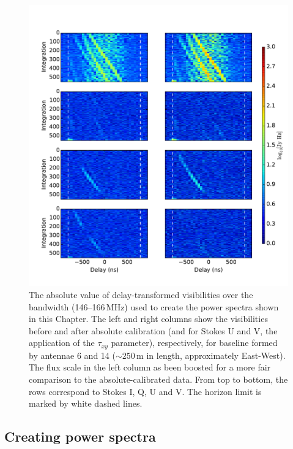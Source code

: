 \begin{figure}[h!]
\centering
\includegraphics[width=\columnwidth]{chapters/eor_window_PAPER/figures/delayfalls_wedgeres.pdf}
\caption[The absolute value of delay-transformed visibilities over the bandwidth (146--166\,MHz) used to create the power spectra shown in this Chapter.]{The absolute value of delay-transformed visibilities over the bandwidth (146--166\,MHz) used to create the power spectra shown in this Chapter. The left and right columns show the visibilities before and after absolute calibration (and for Stokes U and V, the application of the $\tau_{xy}$ parameter), respectively, for baseline formed by antennae 6 and 14 ($\sim 250$\,m in length, approximately East-West). The flux scale in the left column as been boosted for a more fair comparison to the absolute-calibrated data. From top to bottom, the rows correspond to Stokes I, Q, U and V. 
The horizon limit is marked by white dashed lines. 
}
\label{fig:psa32_delay_spectra}
\end{figure}

\subsection{Creating power spectra}
\label{subsec:psa32_create_pspec}
 

